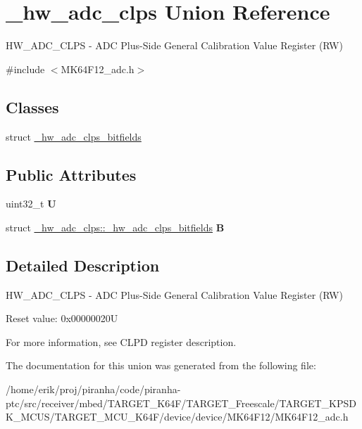 \hypertarget{union__hw__adc__clps}{}\section{\+\_\+hw\+\_\+adc\+\_\+clps Union Reference}
\label{union__hw__adc__clps}


H\+W\+\_\+\+A\+D\+C\+\_\+\+C\+L\+PS -\/ A\+DC Plus-\/\+Side General Calibration Value Register (RW)  




{\ttfamily \#include $<$M\+K64\+F12\+\_\+adc.\+h$>$}

\subsection*{Classes}
\begin{DoxyCompactItemize}
\item 
struct \hyperlink{struct__hw__adc__clps_1_1__hw__adc__clps__bitfields}{\+\_\+hw\+\_\+adc\+\_\+clps\+\_\+bitfields}
\end{DoxyCompactItemize}
\subsection*{Public Attributes}
\begin{DoxyCompactItemize}
\item 
uint32\+\_\+t {\bfseries U}\hypertarget{union__hw__adc__clps_a1ea78080e80369c5ab7b57c95956a201}{}\label{union__hw__adc__clps_a1ea78080e80369c5ab7b57c95956a201}

\item 
struct \hyperlink{struct__hw__adc__clps_1_1__hw__adc__clps__bitfields}{\+\_\+hw\+\_\+adc\+\_\+clps\+::\+\_\+hw\+\_\+adc\+\_\+clps\+\_\+bitfields} {\bfseries B}\hypertarget{union__hw__adc__clps_ade8a60976829eb42f7c796775fcfe5c7}{}\label{union__hw__adc__clps_ade8a60976829eb42f7c796775fcfe5c7}

\end{DoxyCompactItemize}


\subsection{Detailed Description}
H\+W\+\_\+\+A\+D\+C\+\_\+\+C\+L\+PS -\/ A\+DC Plus-\/\+Side General Calibration Value Register (RW) 

Reset value\+: 0x00000020U

For more information, see C\+L\+PD register description. 

The documentation for this union was generated from the following file\+:\begin{DoxyCompactItemize}
\item 
/home/erik/proj/piranha/code/piranha-\/ptc/src/receiver/mbed/\+T\+A\+R\+G\+E\+T\+\_\+\+K64\+F/\+T\+A\+R\+G\+E\+T\+\_\+\+Freescale/\+T\+A\+R\+G\+E\+T\+\_\+\+K\+P\+S\+D\+K\+\_\+\+M\+C\+U\+S/\+T\+A\+R\+G\+E\+T\+\_\+\+M\+C\+U\+\_\+\+K64\+F/device/device/\+M\+K64\+F12/M\+K64\+F12\+\_\+adc.\+h\end{DoxyCompactItemize}
